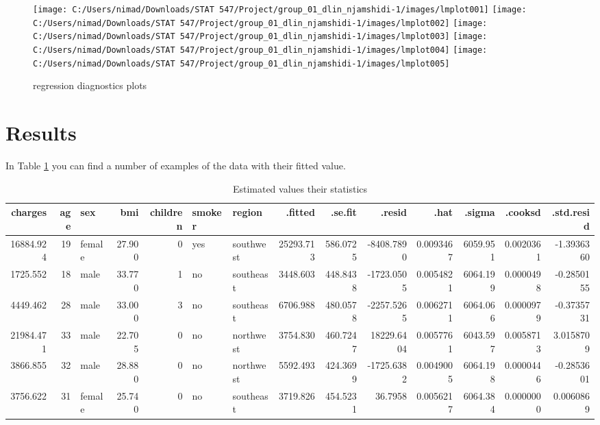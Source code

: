 \documentclass[
]{article}
\begin{document}
\begin{figure}

{\centering \texttt{[image: C:/Users/nimad/Downloads/STAT 547/Project/group\_01\_dlin\_njamshidi-1/images/lmplot001]} \texttt{[image: C:/Users/nimad/Downloads/STAT 547/Project/group\_01\_dlin\_njamshidi-1/images/lmplot002]} \texttt{[image: C:/Users/nimad/Downloads/STAT 547/Project/group\_01\_dlin\_njamshidi-1/images/lmplot003]} \texttt{[image: C:/Users/nimad/Downloads/STAT 547/Project/group\_01\_dlin\_njamshidi-1/images/lmplot004]} \texttt{[image: C:/Users/nimad/Downloads/STAT 547/Project/group\_01\_dlin\_njamshidi-1/images/lmplot005]} 

}

\caption{regression diagnostics plots}\label{fig:regression}
\end{figure}

\hypertarget{results}{%
\section{Results}\label{results}}

In Table \ref{tab:results} you can find a number of examples of the data with their fitted value.

\begin{table}

\caption{\label{tab:results}Estimated values their statistics}
\centering
\begin{tabular}[t]{r|r|l|r|r|l|l|r|r|r|r|r|r|r}
\hline
charges & age & sex & bmi & children & smoker & region & .fitted & .se.fit & .resid & .hat & .sigma & .cooksd & .std.resid\\
\hline
16884.924 & 19 & female & 27.900 & 0 & yes & southwest & 25293.713 & 586.0725 & -8408.7890 & 0.0093467 & 6059.951 & 0.0020361 & -1.3936360\\
\hline
1725.552 & 18 & male & 33.770 & 1 & no & southeast & 3448.603 & 448.8438 & -1723.0505 & 0.0054821 & 6064.199 & 0.0000498 & -0.2850155\\
\hline
4449.462 & 28 & male & 33.000 & 3 & no & southeast & 6706.988 & 480.0578 & -2257.5265 & 0.0062711 & 6064.066 & 0.0000979 & -0.3735731\\
\hline
21984.471 & 33 & male & 22.705 & 0 & no & northwest & 3754.830 & 460.7247 & 18229.6404 & 0.0057761 & 6043.597 & 0.0058713 & 3.0158709\\
\hline
3866.855 & 32 & male & 28.880 & 0 & no & northwest & 5592.493 & 424.3699 & -1725.6382 & 0.0049005 & 6064.198 & 0.0000446 & -0.2853601\\
\hline
3756.622 & 31 & female & 25.740 & 0 & no & southeast & 3719.826 & 454.5231 & 36.7958 & 0.0056217 & 6064.384 & 0.0000000 & 0.0060869\\
\hline
\end{tabular}
\end{table}
\end{document}
